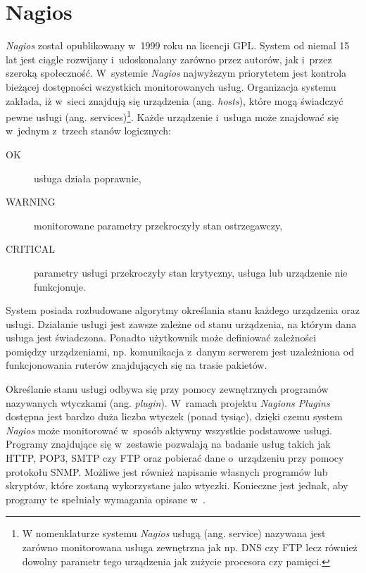 \section[Nagios][Nagios]{Nagios}
\label{sec:Nagios}

{\em Nagios}\cite{www:Nagios} został opublikowany w~1999 roku na licencji GPL. System od
niemal 15 lat jest ciągle rozwijany i~udoskonalany zarówno przez
autorów, jak i~przez szeroką społeczność. W~systemie {\em Nagios} najwyższym
priorytetem jest kontrola bieżącej dostępności wszystkich
monitorowanych usług. Organizacja systemu zakłada, iż w~sieci znajdują
się urządzenia (ang. {\em hosts}), które mogą świadczyć pewne usługi
(ang. services)\footnote{W nomenklaturze systemu {\em Nagios} usługą
  (ang. service) nazywana jest zarówno monitorowana usługa zewnętrzna
  jak np. DNS czy FTP lecz również dowolny parametr tego urządzenia
  jak zużycie procesora czy pamięci.}. Każde urządzenie i~usługa może
  znajdować się w~jednym z~trzech stanów logicznych:

\begin{description}
\item[OK] usługa działa poprawnie,
\item[WARNING] monitorowane parametry przekroczyły stan ostrzegawczy,
\item[CRITICAL] parametry usługi przekroczyły stan krytyczny, usługa
  lub urządzenie nie funkcjonuje.
\end{description}

System posiada rozbudowane algorytmy określania stanu każdego
urządzenia oraz usługi. Działanie usługi jest zawsze zależne od stanu
urządzenia, na którym dana usługa jest świadczona. Ponadto użytkownik
może definiować zależności pomiędzy urządzeniami, np. komunikacja
z~danym serwerem jest uzależniona od funkcjonowania ruterów
znajdujących się na trasie pakietów.

Określanie stanu usługi odbywa się przy pomocy zewnętrznych programów
nazywanych wtyczkami (ang. {\em plugin}). W~ramach projektu {\em
  Nagions Plugins}\cite{www:NagiosPluginProject} dostępna jest bardzo
duża liczba wtyczek (ponad tysiąc), dzięki czemu system {\em Nagios} może
monitorować w~sposób aktywny wszystkie podstawowe usługi. Programy
znajdujące się w~zestawie pozwalają na badanie usług takich jak HTTP,
POP3, SMTP czy FTP oraz pobierać dane o~urządzeniu przy pomocy
protokołu SNMP. Możliwe jest również napisanie własnych programów lub
skryptów, które zostaną wykorzystane jako wtyczki. Konieczne jest
jednak, aby programy te spełniały wymagania opisane
w~\cite{www:NagiosPluginsTutorial}.


